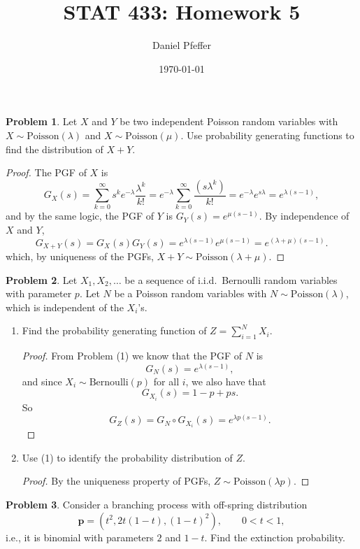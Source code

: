 \documentclass[oneside,reqno]{amsart}
\title{STAT 433: Homework 5}
\author{Daniel Pfeffer}
\date{\today}
\newcommand{\Pois}{\mathrm{Poisson}}
\newcommand{\Ber}{\mathrm{Bernoulli}}
\theoremstyle{definition}
\newtheorem{prob}{Problem}
\begin{document}
\maketitle

\begin{prob}
Let $X$ and $Y$ be two independent Poisson random variables with $X \sim \Pois(\lambda)$ and $X \sim \Pois(\mu)$. Use probability generating functions to find the distribution of $X+Y$. 
\end{prob}

\begin{proof}
The PGF of $X$ is
\[
	G_X(s) = \sum_{k=0}^\infty s^k e^{-\lambda} \frac{\lambda^k}{k!} = e^{-\lambda} \sum_{k=0}^\infty \frac{(s\lambda^k)}{k!} = e^{-\lambda} e^{s\lambda} = e^{\lambda(s-1)},
\]
and by the same logic, the PGF of $Y$ is $G_Y(s) =  e^{\mu(s-1)}$. By independence of $X$ and $Y$,
\[
	G_{X+Y}(s) = G_X(s)G_Y(s) = e^{\lambda(s-1)}e^{\mu(s-1)} = e^{(\lambda + \mu)(s-1)}.
\]
which, by uniqueness of the PGFs, $X+Y\sim \Pois(\lambda + \mu)$.
\end{proof}

\begin{prob}
Let $X_1, X_2, \dotsc$ be a sequence of i.i.d.\ Bernoulli random variables with parameter $p$. Let $N$ be a Poisson random variables with $N \sim \Pois(\lambda)$, which is independent of the $X_i$'s. 
\end{prob}

\begin{enumerate}
\item
Find the probability generating function of $Z=\sum_{i=1}^N X_i$.
\begin{proof}
From Problem (1) we know that the PGF of $N$ is 
\[
	G_N(s) = e^{\lambda(s-1)}, 
\]
and since $X_i \sim \Ber(p)$ for all $i$, we also have that
\[
	G_{X_i}(s) = 1-p + ps.
\]
So
\[
	G_Z(s) = G_N \circ G_{X_i}(s) = e^{\lambda p(s-1)}.
\]
\end{proof}

\item
Use (1) to identify the probability distribution of $Z$.  
\begin{proof}
By the uniqueness property of PGFs, $Z \sim \Pois(\lambda p)$.
\end{proof}
\end{enumerate}


\begin{prob}
Consider a branching process with off-spring distribution 
\[
	\mathbf p = \left(t^2, 2t(1-t), (1-t)^2\right), \qquad 0 < t < 1,
\]	
i.e., it is binomial with parameters $2$ and $1-t$. Find the extinction probability. 
\end{prob}
\end{document}
